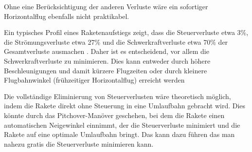 Ohne eine Berücksichtigung der anderen Verluste wäre ein sofortiger Horizontalflug ebenfalls nicht praktikabel.


Ein typisches Profil eines Raketenaufstiegs zeigt, dass die Steuerverluste etwa 3\%, die Strömungsverluste etwa 27\% und die Schwerkraftverluste etwa 70\% der Gesamtverluste ausmachen \cite{leo:astronautics}. 
Daher ist es entscheidend, vor allem die Schwerkraftverluste zu minimieren. 
Dies kann entweder durch höhere Beschleunigungen und damit kürzere Flugzeiten oder durch kleinere Flugbahnwinkel (frühzeitiger Horizontalflug) erreicht werden

Die vollständige Eliminierung von Steuerverlusten wäre theoretisch möglich, indem die Rakete direkt ohne Steuerung in eine Umlaufbahn gebracht wird. 
Dies könnte durch das Pitchover-Manöver geschehen, bei dem die Rakete einen automatischen Neigewinkel einnimmt, der die Steuerverluste minimiert und die Rakete auf eine optimale Umlaufbahn bringt. 
Das kann dazu führen das man nahezu gratis die Steuerverluste minimieren kann. 


